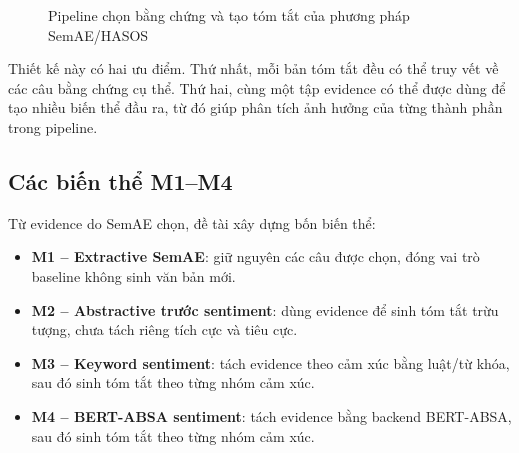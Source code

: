 \begin{figure}[H]
\centering
{}
\caption{Pipeline chọn bằng chứng và tạo tóm tắt của phương pháp SemAE/HASOS}
\label{fig:method2-semae-pipeline}
\end{figure}

Thiết kế này có hai ưu điểm. Thứ nhất, mỗi bản tóm tắt đều có thể truy vết về các câu bằng chứng cụ thể. Thứ hai, cùng một tập evidence có thể được dùng để tạo nhiều biến thể đầu ra, từ đó giúp phân tích ảnh hưởng của từng thành phần trong pipeline.

\subsection{Các biến thể M1--M4}

Từ evidence do SemAE chọn, đề tài xây dựng bốn biến thể:

\begin{itemize}[leftmargin=1.2cm]
    \item \textbf{M1 -- Extractive SemAE}: giữ nguyên các câu được chọn, đóng vai trò baseline không sinh văn bản mới.
    \item \textbf{M2 -- Abstractive trước sentiment}: dùng evidence để sinh tóm tắt trừu tượng, chưa tách riêng tích cực và tiêu cực.
    \item \textbf{M3 -- Keyword sentiment}: tách evidence theo cảm xúc bằng luật/từ khóa, sau đó sinh tóm tắt theo từng nhóm cảm xúc.
    \item \textbf{M4 -- BERT-ABSA sentiment}: tách evidence bằng backend BERT-ABSA, sau đó sinh tóm tắt theo từng nhóm cảm xúc.
\end{itemize}

